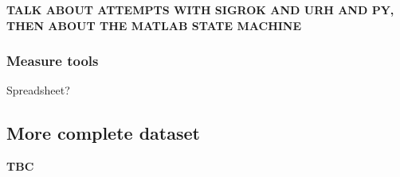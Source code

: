 
\textbf{TALK ABOUT ATTEMPTS WITH SIGROK AND URH AND PY, THEN ABOUT THE MATLAB STATE MACHINE}

\subsubsection{Measure tools}

Spreadsheet?

\subsection{More complete dataset}

\textbf{TBC}
